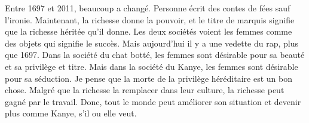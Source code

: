 \documentclass[12pt]{article}
\begin{document}
\begin{doublespace}
Entre 1697 et 2011, beaucoup a changé.
Personne écrit des contes de fées sauf l'ironie.
Maintenant, la richesse donne la pouvoir, et le titre de marquis signifie
	que la richesse héritée qu'il donne.
Les deux sociétés voient les femmes comme des objets qui signifie le succès.
Mais aujourd'hui il y a une vedette du rap, plus que 1697.
Dans la société du chat botté, les femmes sont désirable pour sa beauté et
	sa privilège et titre.
Mais dans la société du Kanye, les femmes sont désirable pour sa séduction.
Je pense que la morte de la privilège héréditaire est un bon chose.
Malgré que la richesse la remplacer dans leur culture, la richesse peut gagné
	par le travail.
Donc, tout le monde peut améliorer son situation et devenir plus comme Kanye,
	s'il ou elle veut.

\end{doublespace}
\end{document}

